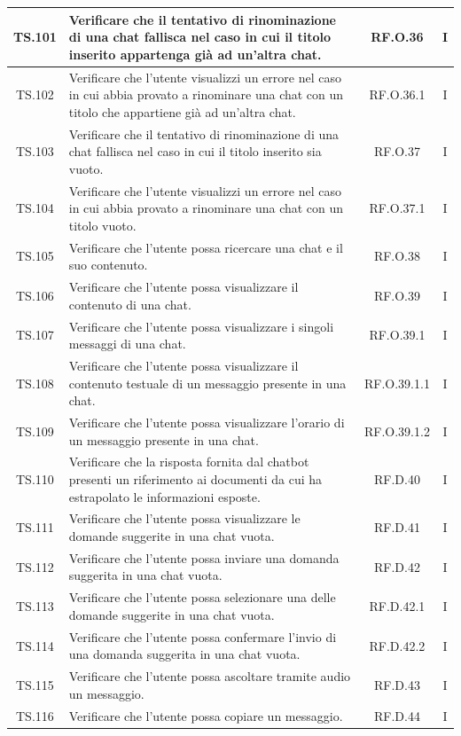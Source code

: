 \documentclass[10pt, a4paper]{article}
\begin{document}
\begin{xltabular}{\textwidth}{|c|X|c|c|}
\hline
TS.101 & Verificare che il tentativo di rinominazione di una chat fallisca nel caso in cui il titolo inserito appartenga già ad un’altra chat. & RF.O.36 & I \\
\hline
TS.102 & Verificare che l'utente visualizzi un errore nel caso in cui abbia provato a rinominare una chat con un titolo che appartiene già ad un’altra chat. & RF.O.36.1 & I \\
\hline
TS.103 & Verificare che il tentativo di rinominazione di una chat fallisca nel caso in cui il titolo inserito sia vuoto. & RF.O.37 & I \\
\hline
TS.104 & Verificare che l'utente visualizzi un errore nel caso in cui abbia provato a rinominare una chat con un titolo vuoto. & RF.O.37.1 & I \\
\hline
TS.105 & Verificare che l'utente possa ricercare una chat e il suo contenuto. & RF.O.38 & I \\
\hline
TS.106 & Verificare che l'utente possa visualizzare il contenuto di una chat. & RF.O.39 & I \\
\hline
TS.107 & Verificare che l'utente possa visualizzare i singoli messaggi di una chat. & RF.O.39.1 & I \\
\hline
TS.108 & Verificare che l'utente possa visualizzare il contenuto testuale di un messaggio presente in una chat. & RF.O.39.1.1 & I \\
\hline
TS.109 & Verificare che l'utente possa visualizzare l’orario di un messaggio presente in una chat. & RF.O.39.1.2 & I \\
\hline
TS.110 & Verificare che la risposta fornita dal chatbot presenti un riferimento ai documenti da cui ha estrapolato le informazioni esposte. & RF.D.40 & I \\
\hline
TS.111 & Verificare che l'utente possa visualizzare le domande suggerite in una chat vuota. & RF.D.41 & I \\
\hline
TS.112 & Verificare che l'utente possa inviare una domanda suggerita in una chat vuota. & RF.D.42 & I \\
\hline
TS.113 & Verificare che l'utente possa selezionare una delle domande suggerite in una chat vuota. & RF.D.42.1 & I \\
\hline
TS.114 & Verificare che l'utente possa confermare l’invio di una domanda suggerita in una chat vuota. & RF.D.42.2 & I \\
\hline
TS.115 & Verificare che l'utente possa ascoltare tramite audio un messaggio. & RF.D.43 & I \\
\hline
TS.116 & Verificare che l'utente possa copiare un messaggio. & RF.D.44 & I \\

\end{xltabular}
\end{document}
